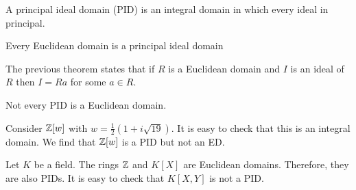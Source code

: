 \documentclass[11pt]{penrose}
\begin{document}
\begin{ndfn}
    A principal ideal domain (PID) is an integral domain in which every ideal in principal.
\end{ndfn}

\begin{nthm}
    Every Euclidean domain is a principal ideal domain
\end{nthm}

\begin{remark}
    The previous theorem states that if $R$ is a Euclidean domain and $I$ is an ideal of $R$ then $I = Ra$ for some $a \in R$.
\end{remark}

\begin{negg}
    Not every PID is a Euclidean domain.

    Consider $\mathbb{Z}[w]$ with $w = \frac{1}{2}(1 + i\sqrt{19})$. It is easy to check that this is an integral domain. We find that $\mathbb{Z}[w]$ is a PID but not an ED.
\end{negg}

\begin{negg}
    Let $K$ be a field. The rings $\mathbb{Z}$ and $K[X]$ are Euclidean domains. Therefore, they are also PIDs. It is easy to check that $K[X,Y]$ is not a PID.
\end{negg}
\end{document}

